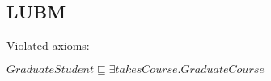 \documentclass{article}
\begin{document}
\begin{itemize}
\end{itemize}

\subsection{LUBM}
\label{sec:lubm}

Violated axioms:

$GraduateStudent \sqsubseteq \exists takesCourse.GraduateCourse$
\end{document}
